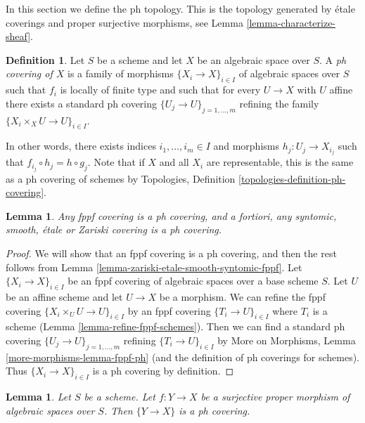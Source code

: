 \documentclass{stacks-project}
\theoremstyle{plain}
\newtheorem{lemma}[subsection]{Lemma}
\theoremstyle{definition}
\newtheorem{definition}[subsection]{Definition}
\theoremstyle{remark}
\numberwithin{equation}{subsection}
\begin{document}
\noindent
In this section we define the ph topology. This is the topology
generated by \'etale coverings and proper surjective morphisms, see
Lemma \ref{lemma-characterize-sheaf}.

\begin{definition}
\label{definition-ph-covering}
Let $S$ be a scheme and let $X$ be an algebraic space over $S$.
A {\it ph covering of $X$} is a family
of morphisms $\{X_i \to X\}_{i \in I}$ of algebraic spaces over $S$
such that $f_i$ is locally of finite type and such that for every
$U \to X$ with $U$ affine there exists a standard ph covering
$\{U_j \to U\}_{j = 1, \ldots, m}$ refining the family
$\{X_i \times_X U \to U\}_{i \in I}$.
\end{definition}

\noindent
In other words, there exists indices $i_1, \ldots, i_m \in I$ and
morphisms $h_j : U_j \to X_{i_j}$ such that
$f_{i_j} \circ h_j = h \circ g_j$. Note that if $X$ and all $X_i$ are
representable, this is the same as a ph covering of schemes by
Topologies, Definition \ref{topologies-definition-ph-covering}.

\begin{lemma}
\label{lemma-zariski-etale-smooth-syntomic-fppf-ph}
Any fppf covering is a ph covering, and a fortiori,
any syntomic, smooth, \'etale or Zariski covering is a ph covering.
\end{lemma}

\begin{proof}
We will show that an fppf covering is a ph covering, and then the
rest follows from Lemma \ref{lemma-zariski-etale-smooth-syntomic-fppf}.
Let $\{X_i \to X\}_{i \in I}$ be an fppf covering of algebraic spaces
over a base scheme $S$. Let $U$ be an affine scheme and let
$U \to X$ be a morphism. We can refine the fppf covering
$\{X_i \times_U U \to U\}_{i \in I}$ by an fppf covering
$\{T_i \to U\}_{i \in I}$ where $T_i$ is a scheme
(Lemma \ref{lemma-refine-fppf-schemes}).
Then we can find a standard ph covering $\{U_j \to U\}_{j = 1, \ldots, m}$
refining $\{T_i \to U\}_{i \in I}$ by
More on Morphisms, Lemma \ref{more-morphisms-lemma-fppf-ph}
(and the definition of ph coverings for schemes).
Thus $\{X_i \to X\}_{i \in I}$ is a ph covering by definition.
\end{proof}

\begin{lemma}
\label{lemma-surjective-proper-ph}
Let $S$ be a scheme. Let $f : Y \to X$ be a surjective proper morphism
of algebraic spaces over $S$. Then $\{Y \to X\}$ is a ph covering.
\end{lemma}
\end{document}
